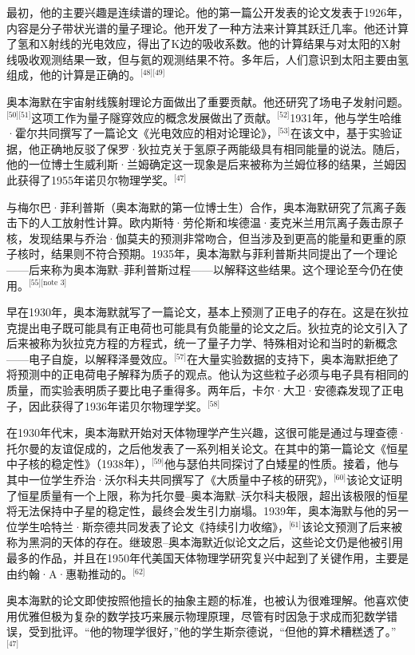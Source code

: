 最初，他的主要兴趣是连续谱的理论。他的第一篇公开发表的论文发表于1926年，内容是分子带状光谱的量子理论。他开发了一种方法来计算其跃迁几率。他还计算了氢和X射线的光电效应，得出了K边的吸收系数。他的计算结果与对太阳的X射线吸收观测结果一致，但与氦的观测结果不符。多年后，人们意识到太阳主要由氢组成，他的计算是正确的。\(^\text{[48][49]}\)

奥本海默在宇宙射线簇射理论方面做出了重要贡献。他还研究了场电子发射问题。\(^\text{[50][51]}\)这项工作为量子隧穿效应的概念发展做出了贡献。\(^\text{[52]}\)1931年，他与学生哈维·霍尔共同撰写了一篇论文《光电效应的相对论理论》，\(^\text{[53]}\)在该文中，基于实验证据，他正确地反驳了保罗·狄拉克关于氢原子两能级具有相同能量的说法。随后，他的一位博士生威利斯·兰姆确定这一现象是后来被称为兰姆位移的结果，兰姆因此获得了1955年诺贝尔物理学奖。\(^\text{[47]}\)

与梅尔巴·菲利普斯（奥本海默的第一位博士生）合作，奥本海默研究了氘离子轰击下的人工放射性计算。欧内斯特·劳伦斯和埃德温·麦克米兰用氘离子轰击原子核，发现结果与乔治·伽莫夫的预测非常吻合，但当涉及到更高的能量和更重的原子核时，结果则不符合预期。1935年，奥本海默与菲利普斯共同提出了一个理论——后来称为奥本海默–菲利普斯过程——以解释这些结果。这个理论至今仍在使用。\(^\text{[55][note 3]}\)

早在1930年，奥本海默就写了一篇论文，基本上预测了正电子的存在。这是在狄拉克提出电子既可能具有正电荷也可能具有负能量的论文之后。狄拉克的论文引入了后来被称为狄拉克方程的方程式，统一了量子力学、特殊相对论和当时的新概念——电子自旋，以解释泽曼效应。\(^\text{[57]}\)在大量实验数据的支持下，奥本海默拒绝了将预测中的正电荷电子解释为质子的观点。他认为这些粒子必须与电子具有相同的质量，而实验表明质子要比电子重得多。两年后，卡尔·大卫·安德森发现了正电子，因此获得了1936年诺贝尔物理学奖。\(^\text{[58]}\)

在1930年代末，奥本海默开始对天体物理学产生兴趣，这很可能是通过与理查德·托尔曼的友谊促成的，之后他发表了一系列相关论文。在其中的第一篇论文《恒星中子核的稳定性》（1938年），\(^\text{[59]}\)他与瑟伯共同探讨了白矮星的性质。接着，他与其中一位学生乔治·沃尔科夫共同撰写了《大质量中子核的研究》，\(^\text{[60]}\)该论文证明了恒星质量有一个上限，称为托尔曼–奥本海默–沃尔科夫极限，超出该极限的恒星将无法保持中子星的稳定性，最终会发生引力崩塌。1939年，奥本海默与他的另一位学生哈特兰·斯奈德共同发表了论文《持续引力收缩》，\(^\text{[61]}\)该论文预测了后来被称为黑洞的天体的存在。继玻恩–奥本海默近似论文之后，这些论文仍是他被引用最多的作品，并且在1950年代美国天体物理学研究复兴中起到了关键作用，主要是由约翰·A·惠勒推动的。\(^\text{[62]}\)

奥本海默的论文即使按照他擅长的抽象主题的标准，也被认为很难理解。他喜欢使用优雅但极为复杂的数学技巧来展示物理原理，尽管有时因急于求成而犯数学错误，受到批评。“他的物理学很好，”他的学生斯奈德说，“但他的算术糟糕透了。”\(^\text{[47]}\)

